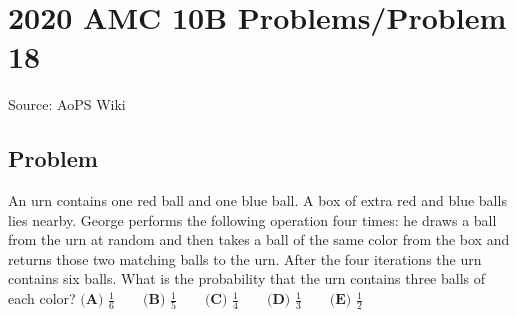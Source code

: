 \documentclass[12pt]{article}
\begin{document}
\section*{{2020 AMC 10B Problems/Problem 18}}
Source: AoPS Wiki

\subsection*{Problem}
An urn contains one red ball and one blue ball. A box of extra red and blue balls lies nearby. George performs the following operation four times: he draws a ball from the urn at random and then takes a ball of the same color from the box and returns those two matching balls to the urn. After the four iterations the urn contains six balls. What is the probability that the urn contains three balls of each color? $\textbf{(A) } \frac16 \qquad \textbf{(B) }\frac15 \qquad \textbf{(C) } \frac14 \qquad \textbf{(D) } \frac13 \qquad \textbf{(E) } \frac12$
\end{document}
